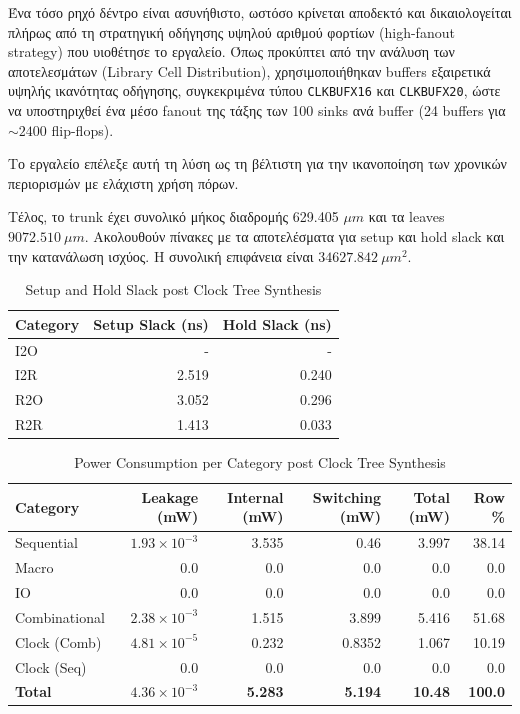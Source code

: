 Ένα τόσο ρηχό δέντρο είναι ασυνήθιστο, ωστόσο κρίνεται αποδεκτό και δικαιολογείται πλήρως από τη στρατηγική οδήγησης υψηλού αριθμού φορτίων (high-fanout strategy) που υιοθέτησε το εργαλείο. Όπως προκύπτει από την ανάλυση των αποτελεσμάτων (Library Cell Distribution), χρησιμοποιήθηκαν buffers εξαιρετικά υψηλής ικανότητας οδήγησης, συγκεκριμένα τύπου \texttt{CLKBUFX16} και \texttt{CLKBUFX20}, ώστε να υποστηριχθεί ένα μέσο fanout της τάξης των 100 sinks ανά buffer (24 buffers για $\sim 2400$ flip-flops). 

Το εργαλείο επέλεξε αυτή τη λύση ως τη βέλτιστη για την ικανοποίηση των χρονικών περιορισμών με ελάχιστη χρήση πόρων.

Τέλος, το trunk έχει συνολικό μήκος διαδρομής 629.405 $\mu m$ και τα leaves $9072.510~\mu m$.
Ακολουθούν πίνακες με τα αποτελέσματα για setup και hold slack και την κατανάλωση ισχύος. Η συνολική επιφάνεια είναι $34627.842~\mu m^2$.

\begin{table}[H]
    \centering
    \caption{Setup and Hold Slack post Clock Tree Synthesis}
    \label{tab:t1_slack_post_cts}
    \begin{tabular}{lrr}
        \toprule
        Category & Setup Slack (ns) & Hold Slack (ns) \\
        \midrule
        I2O & - & - \\
        I2R & 2.519 & 0.240 \\
        R2O & 3.052 & 0.296 \\
        R2R & 1.413 & 0.033 \\
        \bottomrule
    \end{tabular}
\end{table}

\begin{table}[H]
    \centering
    \caption{Power Consumption per Category post Clock Tree Synthesis}
    \label{tab:t1_power_post_cts}
    \begin{tabular}{lrrrrr}
        \toprule
        Category & Leakage (mW) & Internal (mW) & Switching (mW) & Total (mW) & Row \% \\
        \midrule
        Sequential & $1.93\times10^{-3}$ & 3.535 & 0.46 & 3.997 & 38.14 \\
        Macro & 0.0 & 0.0 & 0.0 & 0.0 & 0.0 \\
        IO & 0.0 & 0.0 & 0.0 & 0.0 & 0.0 \\
        Combinational & $2.38\times10^{-3}$ & 1.515 & 3.899 & 5.416 & 51.68 \\
        Clock (Comb) & $4.81\times10^{-5}$ & 0.232 & 0.8352 & 1.067 & 10.19 \\
        Clock (Seq) & 0.0 & 0.0 & 0.0 & 0.0 & 0.0 \\
        \midrule
        \textbf{Total} & $4.36\times10^{-3}$ & \textbf{5.283} & \textbf{5.194} & \textbf{10.48} & \textbf{100.0} \\
        \bottomrule
    \end{tabular}
\end{table}

